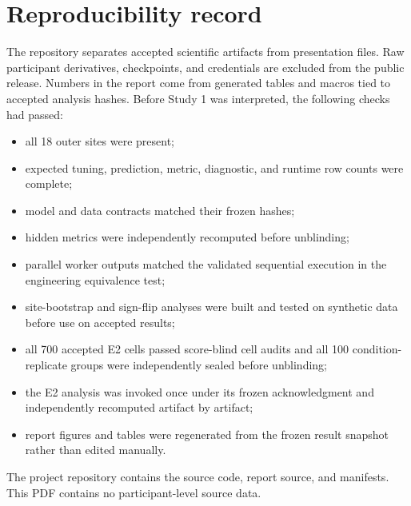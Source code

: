 \documentclass[11pt,a4paper]{article}
\begin{document}
\clearpage
\section{Reproducibility record}

The repository separates accepted scientific artifacts from presentation
files. Raw participant derivatives, checkpoints, and credentials are excluded
from the public release. Numbers in the report come from generated tables and
macros tied to accepted analysis hashes. Before Study 1 was interpreted, the
following checks had passed:

\begin{itemize}
  \item all 18 outer sites were present;
  \item expected tuning, prediction, metric, diagnostic, and runtime row counts
  were complete;
  \item model and data contracts matched their frozen hashes;
  \item hidden metrics were independently recomputed before unblinding;
  \item parallel worker outputs matched the validated sequential execution in
  the engineering equivalence test;
  \item site-bootstrap and sign-flip analyses were built and tested on
  synthetic data before use on accepted results;
  \item all 700 accepted E2 cells passed score-blind cell audits and all 100
  condition-replicate groups were independently sealed before unblinding;
  \item the E2 analysis was invoked once under its frozen acknowledgment and
  independently recomputed artifact by artifact;
  \item report figures and tables were regenerated from the frozen result
  snapshot rather than edited manually.
\end{itemize}

The project repository contains the source code, report source, and
manifests. This PDF contains no participant-level source data.

\begin{singlespace}
\scriptsize


\end{singlespace}
\end{document}
